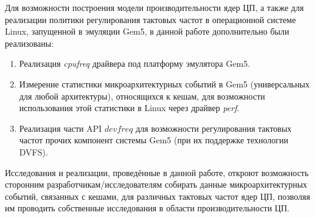     Для возможности построения модели производительности ядер ЦП, а также для реализации политики
    регулирования тактовых частот в операционной системе Linux, запущенной в эмуляции Gem5,
    в данной работе дополнительно были реализованы:
    \begin{enumerate}
        \item Реализация \textit{cpufreq} драйвера под платформу эмулятора Gem5.
        \item Измерение статистики микроархитектурных событий в Gem5 (универсальных для любой архитектуры),
        относящихся к кешам, для возможности использования этой статистики в Linux
        через драйвер \textit{perf}.
        \item Реализация части API $devfreq$ для возможности регулирования
        тактовых частот прочих компонент системы Gem5 (при их поддержке технологии DVFS).
    \end{enumerate}

    Исследования и реализации, проведённые в данной работе, откроют возможность сторонним
    разработчикам/исследователям собирать данные микроархитектурных событий, связанных с кешами,
    для различных тактовых частот ядер ЦП, позволяя им проводить собственные исследования в области
    производительности ЦП.

\newpage
